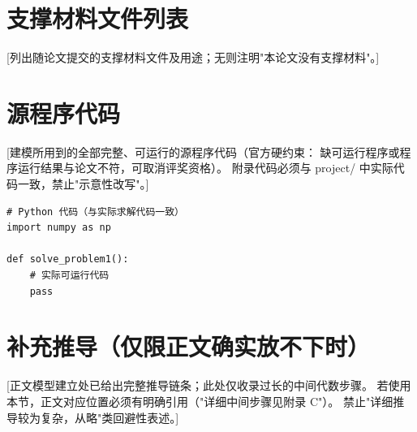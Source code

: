 \documentclass[12pt,a4paper]{ctexart}
\begin{document}
\section{支撑材料文件列表}

[列出随论文提交的支撑材料文件及用途；无则注明"本论文没有支撑材料"。]

\section{源程序代码}

[建模所用到的全部完整、可运行的源程序代码（官方硬约束：
缺可运行程序或程序运行结果与论文不符，可取消评奖资格）。
附录代码必须与 project/ 中实际代码一致，禁止"示意性改写"。]

\begin{lstlisting}[caption={问题1求解代码}]
# Python 代码（与实际求解代码一致）
import numpy as np

def solve_problem1():
    # 实际可运行代码
    pass
\end{lstlisting}

\section{补充推导（仅限正文确实放不下时）}

[正文模型建立处已给出完整推导链条；此处仅收录过长的中间代数步骤。
若使用本节，正文对应位置必须有明确引用（"详细中间步骤见附录 C"）。
禁止"详细推导较为复杂，从略"类回避性表述。]
\end{document}
